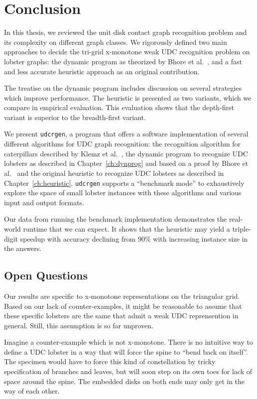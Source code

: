 
\chapter{Conclusion}

In this thesis, we reviewed the unit disk contact graph recognition problem and its complexity on different graph classes. We rigorously defined two main approaches to decide the tri-grid x-monotone weak UDC recognition problem on lobster graphs: the dynamic program as theorized by Bhore et al.~\cite{Bhore2021}, and a fast and less accurate heuristic approach as an original contribution.

The treatise on the dynamic program includes discussion on several strategies which improve performance. The heuristic is presented as two variants, which we compare in empirical evaluation. This evaluation shows that the depth-first variant is superior to the breadth-first variant.

We present \texttt{udcrgen}, a program that offers a software implementation of several different algorithms for UDC graph recognition: the recognition algorithm for caterpillars described by Klemz et al.~\cite{Klemz2015}, the dynamic program to recognize UDC lobsters as described in Chapter~\ref{ch:dynprog} and based on a proof by Bhore et al.~\cite{Bhore2021} and the original heuristic to recognize UDC lobsters as described in Chapter~\ref{ch:heuristic}. \texttt{udcrgen} supports a ``benchmark mode'' to exhaustively explore the space of small lobster instances with these algorithms and various input and output formats.

Our data from running the benchmark implementation demonstrates the real-world runtime that we can expect. It shows that the heuristic may yield a triple-digit speedup with accuracy declining from $90\%$ with increasing instance size in the answers.

\section{Open Questions}

Our results are specific to x-monotone representations on the triangular grid. Based on our lack of counter-examples, it might be reasonable to assume that these specific lobsters are the same that admit a weak UDC reprensention in general. Still, this assumption is so far unproven.

Imagine a counter-example which is not x-monotone. There is no intuitive way to define a UDC lobster in a way that will force the spine to ``bend back on itself''. The specimen would have to force this kind of constellation by tricky specification of branches and leaves, but will soon step on its own toes for lack of space around the spine. The embedded disks on both ends may only get in the way of each other.

